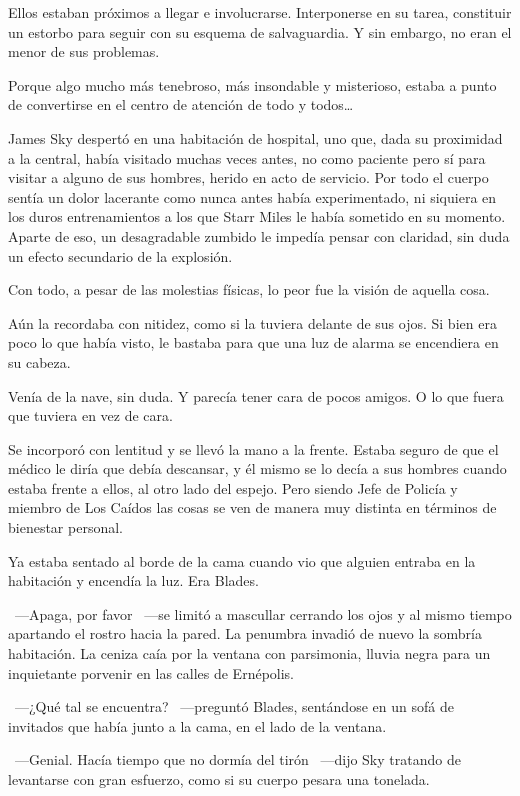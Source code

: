 \noindent
Ellos estaban próximos a llegar e involucrarse. Interponerse en su tarea, constituir un estorbo para seguir con su esquema de salvaguardia. Y sin embargo, no eran el menor de sus problemas.

Porque algo mucho más tenebroso, más insondable y misterioso, estaba a punto de convertirse en el centro de atención de todo y todos\dots

\parbreak\noindent
James Sky despertó en una habitación de hospital, uno que, dada su proximidad a la central, había visitado muchas veces antes, no como paciente pero sí para visitar a alguno de sus hombres, herido en acto de servicio. Por todo el cuerpo sentía un dolor lacerante como nunca antes había experimentado, ni siquiera en los duros entrenamientos a los que Starr Miles le había sometido en su momento. Aparte de eso, un desagradable zumbido le impedía pensar con claridad, sin duda un efecto secundario de la explosión.

Con todo, a pesar de las molestias físicas, lo peor fue la visión de aquella cosa.

Aún la recordaba con nitidez, como si la tuviera delante de sus ojos. Si bien era poco lo que había visto, le bastaba para que una luz de alarma se encendiera en su cabeza.

Venía de la nave, sin duda. Y parecía tener cara de pocos amigos. O lo que fuera que tuviera en vez de cara.

Se incorporó con lentitud y se llevó la mano a la frente. Estaba seguro de que el médico le diría que debía descansar, y él mismo se lo decía a sus hombres cuando estaba frente a ellos, al otro lado del espejo. Pero siendo Jefe de Policía y miembro de Los Caídos las cosas se ven de manera muy distinta en términos de bienestar personal.

Ya estaba sentado al borde de la cama cuando vio que alguien entraba en la habitación y encendía la luz. Era Blades.

~---Apaga, por favor ~---se limitó a mascullar cerrando los ojos y al mismo tiempo apartando el rostro hacia la pared. La penumbra invadió de nuevo la sombría habitación. La ceniza caía por la ventana con parsimonia, lluvia negra para un inquietante porvenir en las calles de Ernépolis.

~---¿Qué tal se encuentra? ~---preguntó Blades, sentándose en un sofá de invitados que había junto a la cama, en el lado de la ventana.

~---Genial. Hacía tiempo que no dormía del tirón ~---dijo Sky tratando de levantarse con gran esfuerzo, como si su cuerpo pesara una tonelada.

